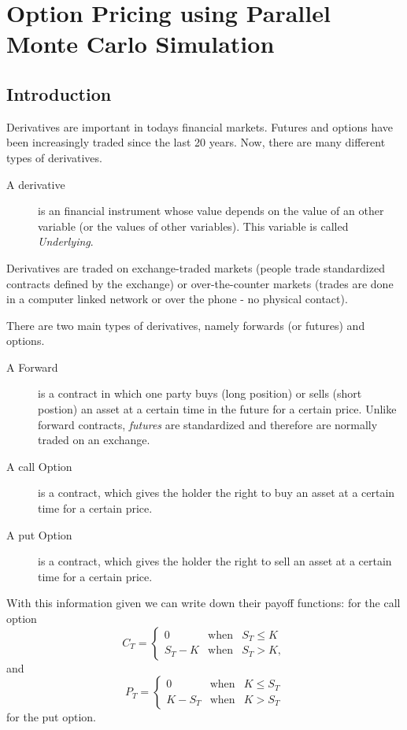\chapter{Option Pricing using Parallel Monte Carlo Simulation}
\label{chap:options}
\section{Introduction}
\label{sec:optionintro}
Derivatives are important in todays financial markets. Futures and
options have been increasingly traded since the last 20 years. Now,
there are many different types of derivatives.
\begin{description}
\item[A derivative] is an financial instrument whose value depends on
  the value of an other variable (or the values of other
  variables). This variable is called \textit{Underlying}.
\end{description}
Derivatives are traded on exchange-traded markets (people trade
standardized contracts defined by the exchange) or over-the-counter
markets (trades are done in a computer linked network or over the
phone - no physical contact).

There are two main types of derivatives, namely forwards (or futures)
and options.

\begin{description}
\item[A Forward] is a contract in which one party buys (long position)
  or sells (short postion) an
  asset at a certain time in the future for a certain price. Unlike
  forward contracts, \textit{futures} are standardized and therefore
  are normally traded on an exchange.
\item[A call Option] is a contract, which gives the holder the right
  to buy an asset at a certain time for a certain price. 
\item[A put Option] is a contract, which gives the holder the right
  to sell an asset at a certain time for a certain price. 
\end{description}

With this information given we can write down their payoff functions:\newline
for the call option
\begin{equation}\label{eq:call}
C_T = \left\{ \begin{array}{lcl} 0 & \textrm{when}& S_T \leq K \\
                         S_T - K & \textrm{when} & S_T > K, \end{array}\right.
\end{equation}
and
\begin{equation}\label{eq:put}
P_T = \left\{ \begin{array}{lcl} 0 & \textrm{when}& K \leq S_T \\
                         K - S_T & \textrm{when} & K > S_T \end{array}\right.
\end{equation}
for the put option.

